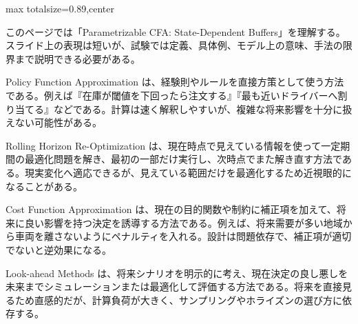 \begin{minipage}[t]{0.58\textwidth}
\begin{adjustbox}{max totalsize={\textwidth}{0.89\textheight},center}
\begin{minipage}{\textwidth}\scriptsize
{}このページでは「Parametrizable CFA: State-Dependent Buffers」を理解する。スライド上の表現は短いが、試験では定義、具体例、モデル上の意味、手法の限界まで説明できる必要がある。\par
Policy Function Approximation は、経験則やルールを直接方策として使う方法である。例えば『在庫が閾値を下回ったら注文する』『最も近いドライバーへ割り当てる』などである。計算は速く解釈しやすいが、複雑な将来影響を十分に扱えない可能性がある。\par
Rolling Horizon Re-Optimization は、現在時点で見えている情報を使って一定期間の最適化問題を解き、最初の一部だけ実行し、次時点でまた解き直す方法である。現実変化へ適応できるが、見えている範囲だけを最適化するため近視眼的になることがある。\par
Cost Function Approximation は、現在の目的関数や制約に補正項を加えて、将来に良い影響を持つ決定を誘導する方法である。例えば、将来需要が多い地域から車両を離さないようにペナルティを入れる。設計は問題依存で、補正項が適切でないと逆効果になる。\par
Look-ahead Methods は、将来シナリオを明示的に考え、現在決定の良し悪しを未来までシミュレーションまたは最適化して評価する方法である。将来を直接見るため直感的だが、計算負荷が大きく、サンプリングやホライズンの選び方に依存する。\par

\end{minipage}
\end{adjustbox}
\end{minipage}

